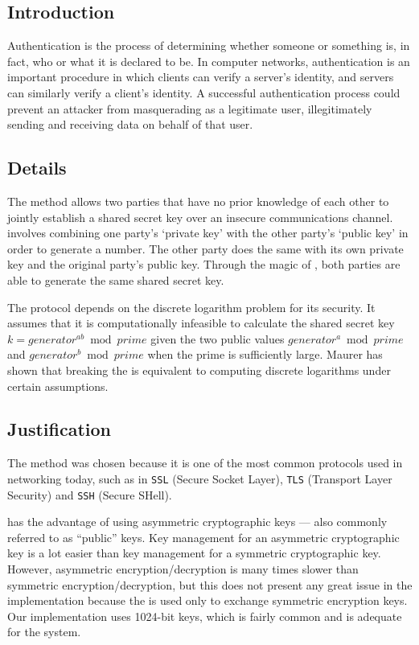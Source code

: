 \documentclass[a4paper,11pt]{article}
\begin{document}
\subsection{Introduction}
Authentication is the process of determining whether someone or something is, in
fact, who or what it is declared to be. In computer networks, authentication is 
an important procedure in which clients can verify a server's identity, and 
servers can similarly verify a client's identity. A successful authentication 
process could prevent an attacker from masquerading as a legitimate user,
illegitimately sending and receiving data on behalf of that user.

\subsection{Details}
The  method allows two parties that have 
no prior knowledge of each other to jointly establish a shared secret key over 
an insecure communications channel.  
involves combining one party's `private key' with the other party's `public key'
in order to generate a number. The other party does the same with its own 
private key and the original party's public key. Through the magic of 
, both parties are able to generate the same shared 
secret key.

The protocol depends on the discrete logarithm problem for its security. It 
assumes that it is computationally infeasible to calculate the shared secret key
$k = generator^{ab} \bmod prime$ given the two public values 
$generator^{a} \bmod prime$ and $generator^{b} \bmod prime$ when the prime is 
sufficiently large. Maurer has shown that breaking the 
 is equivalent to computing discrete 
logarithms under certain assumptions.

\subsection{Justification}
The  method was chosen because it is one
of the most common protocols used in networking today, such as in \verb+SSL+ 
(Secure Socket Layer), \verb+TLS+ (Transport Layer Security) and \verb+SSH+
(Secure SHell).

 has the advantage of using asymmetric cryptographic 
keys --- also commonly referred to as ``public'' keys. Key management for an
asymmetric cryptographic key is a lot easier than key management for a
symmetric cryptographic key. However, asymmetric encryption/decryption is many 
times slower than symmetric encryption/decryption, but this does not present any 
great issue in the \packageName{} implementation because the 
 is used only to exchange symmetric
encryption keys. Our  implementation uses 1024-bit 
keys, which is fairly common and is adequate for the \serviceName{} system.
\end{document}
